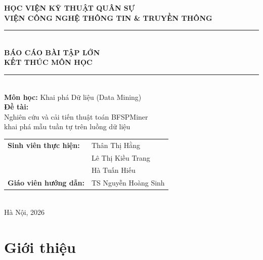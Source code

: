 \documentclass[a4paper,12pt]{report}
\begin{document}
\begin{titlepage}
\centering
\vspace*{1cm}
{\large\textbf{HỌC VIỆN KỸ THUẬT QUÂN SỰ}}\\[0.3cm]
{\large\textbf{VIỆN CÔNG NGHỆ THÔNG TIN \& TRUYỀN THÔNG}}\\[2cm]

\rule{\linewidth}{0.5mm}\\[0.5cm]
{\Huge\bfseries BÁO CÁO BÀI TẬP LỚN}\\[0.3cm]
{\Huge\bfseries KẾT THÚC MÔN HỌC}\\[0.5cm]
\rule{\linewidth}{0.5mm}\\[1cm]

{\LARGE\textbf{Môn học:} Khai phá Dữ liệu (Data Mining)}\\[1cm]

{\Large\textbf{Đề tài:}}\\[0.3cm]
{\Large Nghiên cứu và cải tiến thuật toán BFSPMiner}\\[0.2cm]
{\Large khai phá mẫu tuần tự trên luồng dữ liệu}\\[2cm]

{\large
\begin{tabular}{ll}
\textbf{Sinh viên thực hiện:} & Thân Thị Hằng \\
                              & Lê Thị Kiều Trang \\
                              & Hà Tuấn Hiếu \\[0.5cm]
\textbf{Giáo viên hướng dẫn:} & TS Nguyễn Hoàng Sinh \\
\end{tabular}
}\\[2cm]

{\large Hà Nội, 2026}
\end{titlepage}

\tableofcontents
\newpage

\listoffigures
\newpage

\listoftables
\newpage

\chapter{Giới thiệu}
\label{chap:intro}
\end{document}
